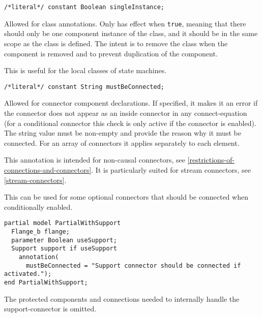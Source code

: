 \begin{annotationdefinition}[singleInstance]
\begin{synopsis}\begin{lstlisting}
/*literal*/ constant Boolean singleInstance;
\end{lstlisting}\end{synopsis}
\begin{semantics}
Allowed for class annotations.
Only has effect when \lstinline!true!, meaning that there should only be one component instance of the class, and it should be in the same scope as the class is defined.
The intent is to remove the class when the component is removed and to prevent duplication of the component.
\begin{nonnormative}
This is useful for the local classes of state machines.
\end{nonnormative}
\end{semantics}
\end{annotationdefinition}

\begin{annotationdefinition}[mustBeConnected]
\begin{synopsis}\begin{lstlisting}
/*literal*/ constant String mustBeConnected;
\end{lstlisting}\end{synopsis}
\begin{semantics}
Allowed for connector component declarations.
If specified, it makes it an error if the connector does not appear as an inside connector in any connect-equation (for a conditional connector this check is only active if the connector is enabled).
The string value must be non-empty and provide the reason why it must be connected.
For an array of connectors it applies separately to each element.

\begin{nonnormative}
This annotation is intended for non-causal connectors, see \cref{restrictions-of-connections-and-connectors}.
It is particularly suited for stream connectors, see \cref{stream-connectors}.
\end{nonnormative}

\begin{example}
This can be used for some optional connectors that should be connected when conditionally enabled.
\begin{lstlisting}[language=modelica]
partial model PartialWithSupport
  Flange_b flange;
  parameter Boolean useSupport;
  Support support if useSupport
    annotation(
      mustBeConnected = "Support connector should be connected if activated.");
end PartialWithSupport;
\end{lstlisting}
The protected components and connections needed to internally handle the support-connector is omitted.
\end{example}
\end{semantics}
\end{annotationdefinition}

